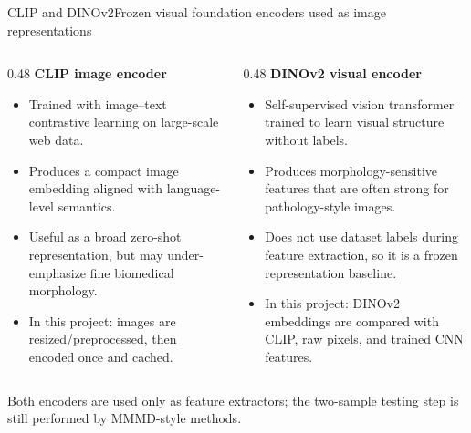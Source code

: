 \documentclass[aspectratio=169,10pt]{beamer}
\newcommand{\pos}[1]{\textcolor{fudanblue}{#1}}
\newcommand{\HL}[1]{\textcolor{accentgreen}{#1}}
\newcommand{\smallnote}[1]{%
  {\scriptsize\color{mutedgray}#1}
}
\begin{document}
\begin{frame}{CLIP and DINOv2}{Frozen visual foundation encoders used as image representations}
\begin{columns}[T,totalwidth=\linewidth]
\begin{column}{0.48\linewidth}
\textbf{\pos{CLIP image encoder}}
\begin{itemize}
  \item Trained with image--text contrastive learning on large-scale web data.
  \item Produces a compact image embedding aligned with language-level semantics.
  \item Useful as a broad zero-shot representation, but may under-emphasize fine biomedical morphology.
  \item In this project: images are resized/preprocessed, then encoded once and cached.
\end{itemize}
\end{column}
\begin{column}{0.48\linewidth}
\textbf{\HL{DINOv2 visual encoder}}
\begin{itemize}
  \item Self-supervised vision transformer trained to learn visual structure without labels.
  \item Produces morphology-sensitive features that are often strong for pathology-style images.
  \item Does not use dataset labels during feature extraction, so it is a frozen representation baseline.
  \item In this project: DINOv2 embeddings are compared with CLIP, raw pixels, and trained CNN features.
\end{itemize}
\end{column}
\end{columns}

\vspace{0.22cm}
\begin{center}
\smallnote{Both encoders are used only as feature extractors; the two-sample testing step is still performed by MMMD-style methods.}
\end{center}
\end{frame}
\end{document}
